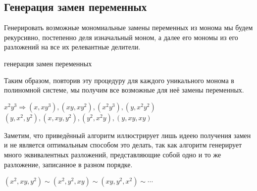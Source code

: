 \subsection{Генерация замен переменных}

Генерировать возможные мономиальные замены переменных из монома мы будем рекурсивно, постепенно деля изначальный моном, а далее его мономы из его разложений на все их релевантные делители.

\begin{algorithm}[H]
\SetAlgoLined
{}

\BlankLine
\BlankLine
{}
\caption{генерация замен переменных}
\label{algo:Replacement-Gen}
\end{algorithm}

Таким образом, повторив эту процедуру для каждого уникального монома в полиномной системе, мы получим все возможные для неё замены переменных. 

\begin{example}
    $x^2y^3 \Longrightarrow (x, xy^3), (xy, xy^2), (x^2 y^3), (y, x^2 y^2)$ \linebreak $(y, x^2, y^2), (x, xy, y^2), (y^2, x^2 y), (y, xy, xy)$
\end{example}

Заметим, что приведённый алгоритм иллюстрирует лишь идеею получения замен и не является оптимальным способом это делать, так как алгоритм генерирует много эквивалентных разложений, представляющие собой одно и то же разложение, записанное в разном порядке.
\begin{example}
    $(x^2, xy, y^2) \sim (x^2, y^2, xy) \sim (xy, y^2, x^2) \sim \cdots$
\end{example}

